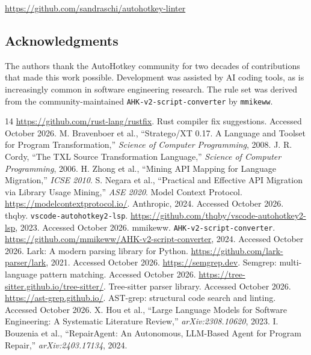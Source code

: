 \documentclass[11pt,a4paper]{article}
\begin{document}
\url{https://github.com/sandraschi/autohotkey-linter}

\subsection*{Acknowledgments}

The authors thank the AutoHotkey community for two decades of contributions that made this work possible. Development was assisted by AI coding tools, as is increasingly common in software engineering research. The rule set was derived from the community-maintained \texttt{AHK-v2-script-converter} by \texttt{mmikeww}.

\begin{thebibliography}{14}
\url{https://github.com/rust-lang/rustfix}. Rust compiler fix suggestions. Accessed October 2026.
M. Bravenboer et al., ``Stratego/XT 0.17. A Language and Toolset for Program Transformation,'' \textit{Science of Computer Programming}, 2008.
J. R. Cordy, ``The TXL Source Transformation Language,'' \textit{Science of Computer Programming}, 2006.
H. Zhong et al., ``Mining API Mapping for Language Migration,'' \textit{ICSE 2010}.
S. Negara et al., ``Practical and Effective API Migration via Library Usage Mining,'' \textit{ASE 2020}.
Model Context Protocol. \url{https://modelcontextprotocol.io/}. Anthropic, 2024. Accessed October 2026.
thqby. \texttt{vscode-autohotkey2-lsp}. \url{https://github.com/thqby/vscode-autohotkey2-lsp}, 2023. Accessed October 2026.
mmikeww. \texttt{AHK-v2-script-converter}. \url{https://github.com/mmikeww/AHK-v2-script-converter}, 2024. Accessed October 2026.
Lark: A modern parsing library for Python. \url{https://github.com/lark-parser/lark}, 2021. Accessed October 2026.
\url{https://semgrep.dev}. Semgrep: multi-language pattern matching. Accessed October 2026.
\url{https://tree-sitter.github.io/tree-sitter/}. Tree-sitter parser library. Accessed October 2026.
\url{https://ast-grep.github.io/}. AST-grep: structural code search and linting. Accessed October 2026.
X. Hou et al., ``Large Language Models for Software Engineering: A Systematic Literature Review,'' \textit{arXiv:2308.10620}, 2023.
I. Bouzenia et al., ``RepairAgent: An Autonomous, LLM-Based Agent for Program Repair,'' \textit{arXiv:2403.17134}, 2024.
\end{thebibliography}
\end{document}
